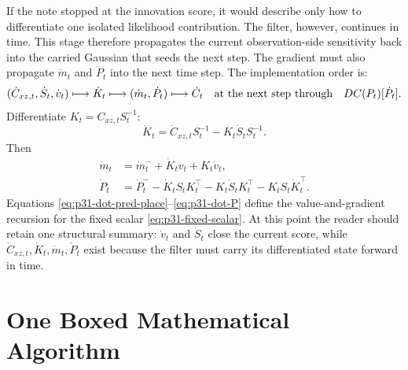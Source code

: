 \documentclass[11pt]{article}
\numberwithin{equation}{section}
\begin{document}
If the note stopped at the innovation score, it would describe only how to
differentiate one isolated likelihood contribution.  The filter, however,
continues in time.  This stage therefore propagates the current observation-side
sensitivity back into the carried Gaussian that seeds the next step.  The
gradient must also propagate \(\dot m_t\) and \(\dot P_t\) into the next
time step.  The implementation order is:
\begin{equation}
  (\dot C_{xz,t},\dot S_t,\dot v_t)
  \longmapsto
  \dot K_t
  \longmapsto
  (\dot m_t,\dot P_t)
  \longmapsto
  \dot C_t
  \quad\hbox{at the next step through}\quad
  DC(P_t)[\dot P_t].
  \label{eq:p32-posterior-sensitivity-order}
\end{equation}
Differentiate \(K_t=C_{xz,t}S_t^{-1}\):
\begin{equation}
  \dot K_t
  =
  \dot C_{xz,t}S_t^{-1}
  -K_t\dot S_tS_t^{-1}.
  \label{eq:p31-dot-K}
\end{equation}
Then
\begin{align}
  \dot m_t
  &=
  \dot m_t^-+\dot K_tv_t+K_t\dot v_t,
  \label{eq:p31-dot-m}\\
  \dot P_t
  &=
  \dot P_t^-
  -\dot K_tS_tK_t^\top
  -K_t\dot S_tK_t^\top
  -K_tS_t\dot K_t^\top.
  \label{eq:p31-dot-P}
\end{align}
Equations \eqref{eq:p31-dot-pred-place}--\eqref{eq:p31-dot-P} define the
value-and-gradient recursion for the fixed scalar
\eqref{eq:p31-fixed-scalar}.  At this point the reader should retain one
structural summary: \(\dot v_t\) and \(\dot S_t\) close the current score, while
\(\dot C_{xz,t},\dot K_t,\dot m_t,\dot P_t\) exist because the filter must carry
its differentiated state forward in time.

\section{One Boxed Mathematical Algorithm}
\label{sec:p31-boxed-algorithm}
\end{document}
